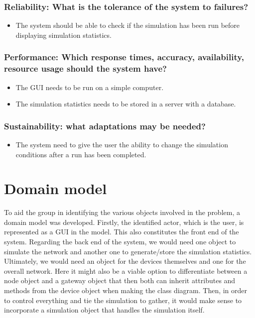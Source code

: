 \subsubsection{Reliability: What is the tolerance of the system to failures?}
\begin{itemize}
  \item The system should be able to check if the simulation has been run before displaying simulation statistics.
\end{itemize}

\subsubsection{Performance: Which response times, accuracy, availability, resource usage should the system have?}

\begin{itemize}
  \item The GUI needs to be run on a simple computer.
  \item The simulation statistics needs to be stored in a server with a database.
\end{itemize}

\subsubsection{Sustainability: what adaptations may be needed?}
\begin{itemize}
  \item The system need to give the user the ability to change the simulation conditions after a run has been completed.
\end{itemize}

\section{Domain model}
To aid the group in identifying the various objects involved in the problem, a domain model was developed. Firstly, the identified actor, which is the user, is represented as a GUI in the model. This also constitutes the front end of the system. Regarding the back end of the system, we would need one object to simulate the network and another one to generate/store the simulation statistics. Ultimately, we would need an object for the devices themselves and one for the overall network. Here it might also be a viable option to differentiate between a node object and a gateway object that then both can inherit attributes and methods from the device object when making the class diagram. Then, in order to control everything and tie the simulation to gather, it would make sense to incorporate a simulation object that handles the simulation itself.

